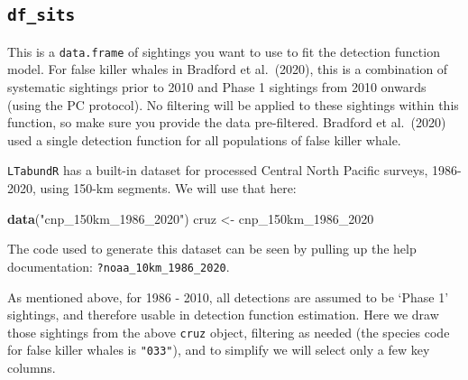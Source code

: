 \documentclass[
]{book}
\newenvironment{Shaded}{\begin{snugshade}}{\end{snugshade}}
\newcommand{\DecValTok}[1]{\textcolor[rgb]{0.00,0.00,0.81}{#1}}
\newcommand{\KeywordTok}[1]{\textcolor[rgb]{0.13,0.29,0.53}{\textbf{#1}}}
\newcommand{\NormalTok}[1]{#1}
\newcommand{\StringTok}[1]{\textcolor[rgb]{0.31,0.60,0.02}{#1}}
\begin{document}
\hypertarget{df_sits}{%
\subsection*{\texorpdfstring{\texttt{df\_sits}}{df\_sits}}\label{df_sits}}

This is a \texttt{data.frame} of sightings you want to use to fit the detection function model. For false killer whales in Bradford et al.~(2020), this is a combination of systematic sightings prior to 2010 and Phase 1 sightings from 2010 onwards (using the PC protocol). No filtering will be applied to these sightings within this function, so make sure you provide the data pre-filtered. Bradford et al.~(2020) used a single detection function for all populations of false killer whale.

\texttt{LTabundR} has a built-in dataset for processed Central North Pacific surveys, 1986-2020, using 150-km segments. We will use that here:

\begin{Shaded}
\begin{Highlighting}[]
\KeywordTok{data}\NormalTok{(}\StringTok{"cnp_150km_1986_2020"}\NormalTok{)}
\NormalTok{cruz <-}\StringTok{ }\NormalTok{cnp_150km_}\DecValTok{1986}\NormalTok{_}\DecValTok{2020}
\end{Highlighting}
\end{Shaded}

The code used to generate this dataset can be seen by pulling up the help documentation: \texttt{?noaa\_10km\_1986\_2020}.

As mentioned above, for 1986 - 2010, all detections are assumed to be `Phase 1' sightings, and therefore usable in detection function estimation. Here we draw those sightings from the above \texttt{cruz} object, filtering as needed (the species code for false killer whales is \texttt{"033"}), and to simplify we will select only a few key columns.
\end{document}
